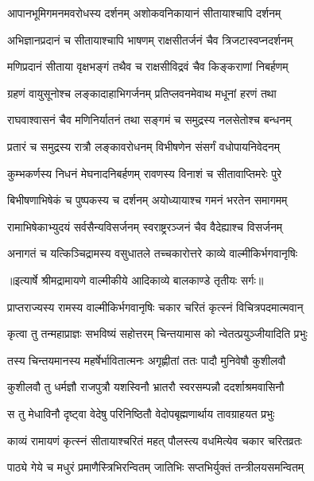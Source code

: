 \twolineshloka
{आपानभूमिगमनमवरोधस्य दर्शनम्}
{अशोकवनिकायानं सीतायाश्चापि दर्शनम्} %

\twolineshloka
{अभिज्ञानप्रदानं च सीतायाश्चापि भाषणम्}
{राक्षसीतर्जनं चैव त्रिजटास्वप्नदर्शनम्} %

\twolineshloka
{मणिप्रदानं सीताया वृक्षभङ्गं तथैव च}
{राक्षसीविद्रवं चैव किङ्कराणां निबर्हणम्} %

\twolineshloka
{ग्रहणं वायुसूनोश्च लङ्कादाहाभिगर्जनम्}
{प्रतिप्लवनमेवाथ मधूनां हरणं तथा} %

\twolineshloka
{राघवाश्वासनं चैव मणिनिर्यातनं तथा}
{सङ्गमं च समुद्रस्य नलसेतोश्च बन्धनम्} %

\twolineshloka
{प्रतारं च समुद्रस्य रात्रौ लङ्कावरोधनम्}
{विभीषणेन संसर्गं वधोपायनिवेदनम्} %

\twolineshloka
{कुम्भकर्णस्य निधनं मेघनादनिबर्हणम्}
{रावणस्य विनाशं च सीतावाप्तिमरेः पुरे} %

\twolineshloka
{बिभीषणाभिषेकं च पुष्पकस्य च दर्शनम्}
{अयोध्यायाश्च गमनं भरतेन समागमम्} %

\twolineshloka
{रामाभिषेकाभ्युदयं सर्वसैन्यविसर्जनम्}
{स्वराष्ट्ररञ्जनं चैव वैदेह्याश्च विसर्जनम्} %

\twolineshloka
{अनागतं च यत्किञ्चिद्रामस्य वसुधातले}
{तच्चकारोत्तरे काव्ये वाल्मीकिर्भगवानृषिः} %


{॥इत्यार्षे श्रीमद्रामायणे वाल्मीकीये आदिकाव्ये बालकाण्डे तृतीयः सर्गः॥}


\twolineshloka
{प्राप्तराज्यस्य रामस्य वाल्मीकिर्भगवानृषिः}
{चकार चरितं कृत्स्नं विचित्रपदमात्मवान्} %

\twolineshloka
{कृत्वा तु तन्महाप्राज्ञः सभविष्यं सहोत्तरम्}
{चिन्तयामास को न्वेतत्प्रयुञ्जीयादिति प्रभुः} %

\twolineshloka
{तस्य चिन्तयमानस्य महर्षेर्भावितात्मनः}
{अगृह्णीतां ततः पादौ मुनिवेषौ कुशीलवौ} %

\twolineshloka
{कुशीलवौ तु धर्मज्ञौ राजपुत्रौ यशस्विनौ}
{भ्रातरौ स्वरसम्पन्नौ ददर्शाश्रमवासिनौ} %

\twolineshloka
{स तु मेधाविनौ दृष्ट्वा वेदेषु परिनिष्ठितौ}
{वेदोपबृह्मणार्थाय तावग्राहयत प्रभुः} %

\twolineshloka
{काव्यं रामायणं कृत्स्नं सीतायाश्चरितं महत्}
{पौलस्त्य वधमित्येव चकार चरितव्रतः} %

\twolineshloka
{पाठ्ये गेये च मधुरं प्रमाणैस्त्रिभिरन्वितम्}
{जातिभिः सप्तभिर्युक्तं तन्त्रीलयसमन्वितम्} %

